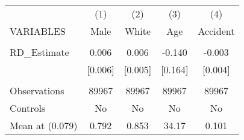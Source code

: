 \documentclass[]{article}
\begin{document}
\begin{tabular}{lcccc} \hline
 & (1) & (2) & (3) & (4) \\
VARIABLES & Male & White & Age & Accident \\ \hline
 &  &  &  &  \\
RD\_Estimate & 0.006 & 0.006 & -0.140 & -0.003 \\
 & [0.006] & [0.005] & [0.164] & [0.004] \\
 &  &  &  &  \\
Observations & 89967 & 89967 & 89967 & 89967 \\
Controls & No & No & No & No \\
 Mean at (0.079) & 0.792 & 0.853 & 34.17 & 0.101 \\ \hline
\end{tabular}
\end{document}
